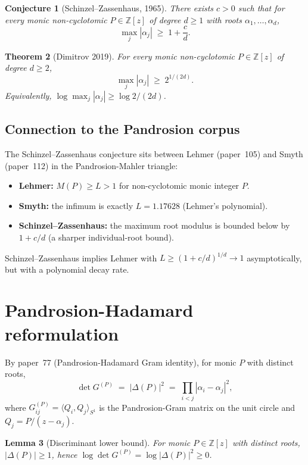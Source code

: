 \documentclass[11pt,a4paper]{article}
\newtheorem{theorem}{Theorem}[section]
\newtheorem{lemma}[theorem]{Lemma}
\newtheorem{conjecture}[theorem]{Conjecture}
\begin{document}
\begin{conjecture}[Schinzel--Zassenhaus, 1965]\label{conj:SZ}
There exists $c > 0$ such that for every monic non-cyclotomic $P \in \mathbb{Z}[z]$
of degree $d \ge 1$ with roots $\alpha_1, \ldots, \alpha_d$,
\[
\max_j |\alpha_j| \;\ge\; 1 + \frac{c}{d}.
\]
\end{conjecture}

\begin{theorem}[Dimitrov 2019]\label{thm:dimitrov}
For every monic non-cyclotomic $P \in \mathbb{Z}[z]$ of degree $d \ge 2$,
\[
\max_j |\alpha_j| \;\ge\; 2^{1/(2d)}.
\]
Equivalently, $\log \max_j |\alpha_j| \ge \log 2/(2d)$.
\end{theorem}

\subsection{Connection to the Pandrosion corpus}

The Schinzel--Zassenhaus conjecture sits between Lehmer (paper~105) and Smyth
(paper~112) in the Pandrosion-Mahler triangle:

\begin{itemize}
\item \textbf{Lehmer:} $M(P) \ge L > 1$ for non-cyclotomic monic integer $P$.
\item \textbf{Smyth:} the infimum is exactly $L = 1.17628$ (Lehmer's polynomial).
\item \textbf{Schinzel--Zassenhaus:} the maximum root modulus is bounded
below by $1 + c/d$ (a sharper individual-root bound).
\end{itemize}

Schinzel--Zassenhaus implies Lehmer with $L \ge (1 + c/d)^{1/d} \to 1$ asymptotically,
but with a polynomial decay rate.

\section{Pandrosion-Hadamard reformulation}\label{sec:pandrosion-reform}

By paper~77 (Pandrosion-Hadamard Gram identity), for monic $P$ with distinct roots,
\[
\det G^{(P)} \;=\; |\Delta(P)|^2 \;=\; \prod_{i<j} |\alpha_i - \alpha_j|^2,
\]
where $G^{(P)}_{ij} = \langle Q_i, Q_j \rangle_{S^1}$ is the Pandrosion-Gram
matrix on the unit circle and $Q_j = P/(z - \alpha_j)$.

\begin{lemma}[Discriminant lower bound]\label{lem:disc}
For monic $P \in \mathbb{Z}[z]$ with distinct roots, $|\Delta(P)| \ge 1$,
hence $\log \det G^{(P)} = \log |\Delta(P)|^2 \ge 0$.
\end{lemma}
\end{document}
